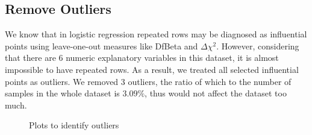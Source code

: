 \documentclass[a4paper,11pt,onecolumn,twoside]{article}
\begin{document}
\subsection{Remove Outliers}
We know that in logistic regression repeated rows may be diagnosed as influential points using leave-one-out measures like DfBeta and $\Delta\chi^2$. However, considering that there are 6 numeric explanatory variables in this dataset, it is almost impossible to have repeated rows. As a result, we treated all selected influential points as outliers. We removed 3 outliers, the ratio of which to the number of samples in the whole dataset is $3.09\%$, thus would not affect the dataset too much.\par
\begin{figure}[H]
	\centering
	\caption{Plots to identify outliers}
\end{figure}
\end{document}
